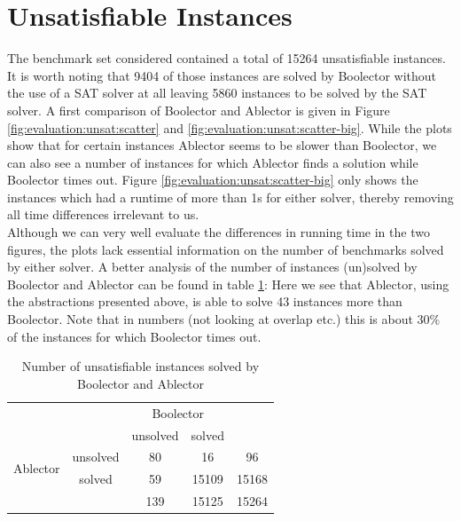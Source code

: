 \section{Unsatisfiable Instances}
The benchmark set considered contained a total of 15264 unsatisfiable instances. It is worth noting that 9404 of those instances are solved by Boolector without the use of a SAT solver at all leaving 5860 instances to be solved by the SAT solver. A first comparison of Boolector and Ablector is given in Figure \ref{fig:evaluation:unsat:scatter} and \ref{fig:evaluation:unsat:scatter-big}. While the plots show that for certain instances Ablector seems to be slower than Boolector, we can also see a number of instances for which Ablector finds a solution while Boolector times out. Figure \ref{fig:evaluation:unsat:scatter-big} only shows the instances which had a runtime of more than 1s for either solver, thereby removing all time differences irrelevant to us.\\
Although we can very well evaluate the differences in running time in the two figures, the plots lack essential information on the number of benchmarks solved by either solver.
A better analysis of the number of instances (un)solved by Boolector and Ablector can be found in table \ref{tab:evaluation:unsat:solvedUnsolved}:
Here we see that Ablector, using the abstractions presented above, is able to solve 43 instances more than Boolector. Note that in numbers (not looking at overlap etc.) this is about $30\%$ of the instances for which Boolector times out.

\begin{table}[ht]
    \begin{center}
    \begin{tabular}{cc|c|c|c}
        &&\multicolumn{2}{c|}{Boolector}&\\
        &&unsolved&solved&\\ \hline
        \multirow{2}{*}{Ablector}&unsolved& 80 & 16 & 96 \\ \cline{2-5}
        & solved & 59 & 15109 & 15168 \\ \hline
        & & 139 & 15125 & 15264 \\
    \end{tabular}
    \end{center}
    \caption{Number of unsatisfiable instances solved by Boolector and Ablector}
    \label{tab:evaluation:unsat:solvedUnsolved}
\end{table}

